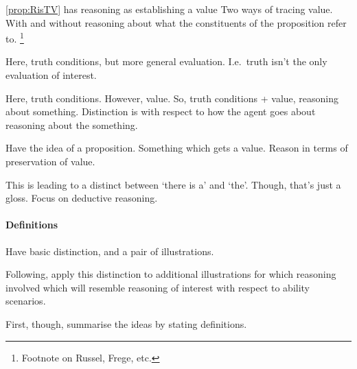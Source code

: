 \begin{note}
  {\color{red} \autoref{prop:RisTV} has reasoning as establishing a value}
  Two ways of tracing value.
  With and without reasoning about what the constituents of the proposition refer to.\nolinebreak
  \footnote{
    Footnote on Russel, Frege, etc.
  }

  Here, truth conditions, but more general evaluation.
  I.e.\ truth isn't the only evaluation of interest.

  Here, truth conditions.
  However, value.
  So, truth conditions + value, reasoning about something.
  Distinction is with respect to how the agent goes about reasoning about the something.

  Have the idea of a proposition.
  Something which gets a value.
  Reason in terms of preservation of value.

  
\end{note}

\begin{note}
  {
    \color{red}
    This is leading to a distinct between `there is a' and `the'.
    Though, that's just a gloss.
  }
  Focus on deductive reasoning.
\end{note}

\paragraph*{Definitions}

\begin{note}
  Have basic distinction, and a pair of illustrations.

  Following, apply this distinction to additional illustrations for which reasoning involved which will resemble reasoning of interest with respect to  ability scenarios.

  First, though, summarise the ideas by stating definitions.
\end{note}

